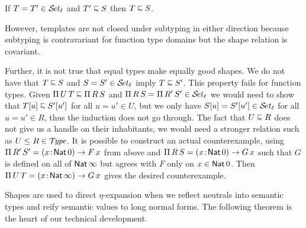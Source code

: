 \documentclass[acmsmall%
]{acmart}\settopmatter{printfolios=true}
\begin{document}
\begin{lemma}
  If\/ $T = T' \in \SET[\ell]$ and $T' \shape S$ then $T \shape S$.
\end{lemma}

However, templates are not closed under subtyping in either direction because subtyping is contravariant for function type domains but the shape relation is covariant.

Further, it is not true that equal types make equally good shapes.  We do not have that
$T \shape S$ and $S = S' \in \SET[\ell]$ imply $T \shape S'$.  This property fails for function types.
Given $\piT U T \shape \piT R S$ and $\piT R S = \piT {R'}{S'} \in \SET[\ell]$ we would need to show that $T[u] \shape S'[u']$ for all $u = u' \in U$, but we only have $S[u] = S'[u'] \in \SET[\ell]$ for all $u = u' \in R$, thus the induction does not go through.  The fact that $U \shape R$ does not give us a handle on their inhabitants, we would need a stronger relation such as $U \leq R \in \TYPE$.
It is possible to construct an actual counterexample, using
$\piT {R'} S' =  \funT x {\Nat 0} {F\,x}$ from above and $\piT R S = \funT x {\Nat 0} {G\,x}$
such that $G$ is defined on all of $\Nat \infty$ but agrees with $F$ only on $x \in \Nat 0$.
Then $\piT U T = \funT x {\Nat \infty} {G\,x}$ gives the desired counterexample.




Shapes are used to direct $\eta$-expansion when we reflect neutrals into semantic types and reify semantic values to long normal forms.  The following theorem is the heart of our technical development.
\end{document}
